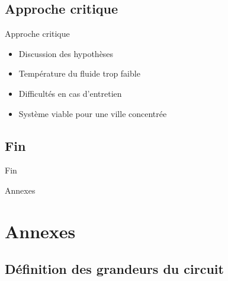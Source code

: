 \documentclass[hyperref={pdfpagelabels=false}]{beamer}
\begin{document}
\subsection*{Approche critique}\label{icu4}
\begin{frame}{Approche critique}
\begin{itemize}
\item Discussion des hypothèses
\item Température du fluide trop faible 
\item Difficultés en cas d'entretien
\item Système viable pour une ville concentrée
\end{itemize}
\end{frame}

\subsection*{Fin}\label{fin}
\begin{frame}
\begin{center}
\huge{Fin}
\end{center}
\end{frame}

\appendix

\begin{frame}
\begin{center}
\huge{Annexes}
\end{center}
\end{frame}

\section{Annexes}
\subsection*{Définition des grandeurs du circuit}
\end{document}
